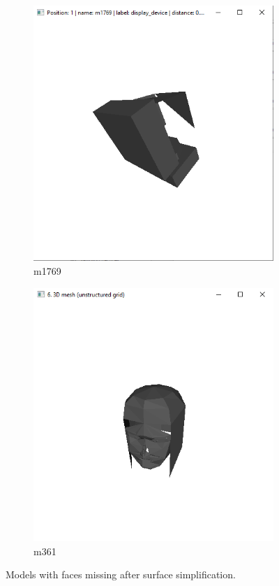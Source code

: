 \documentclass{bigdata}
\begin{document}
\begin{figure}[h!]
	\centering
	\begin{subfigure}[b]{0.4\linewidth}
		\includegraphics[width=\linewidth]{Pictures/problem1.png}
		\caption{m1769}
	\end{subfigure}
	\begin{subfigure}[b]{0.4\linewidth}
		\includegraphics[width=\linewidth]{Pictures/problem2.png}
		\caption{m361}
	\end{subfigure}
	\caption{Models with faces missing after surface simplification.}
	\label{fig:problems}
\end{figure}
\end{document}
